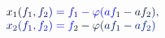 \documentclass[12pt]{article}
\begin{document}
\makeatletter
\renewcommand*{\@textcolor}[3]{%
  \protect\leavevmode
  \begingroup
    \color#1{#2}#3%
  \endgroup
}
\makeatother
\begin{displaymath}
\begin{array} {rl} & { { } \mathcolor[RGB]{0,0,15}{x} _ { \mathcolor[RGB]{0,0,30}{1} } \mathcolor[RGB]{0,0,45}{(} \mathcolor[RGB]{0,0,60}{f} _ { \mathcolor[RGB]{0,0,75}{1} } \mathcolor[RGB]{0,0,90}{,} \mathcolor[RGB]{0,0,105}{f} _ { \mathcolor[RGB]{0,0,120}{2} } \mathcolor[RGB]{0,0,135}{)} \mathcolor[RGB]{0,0,150}{=} \mathcolor[RGB]{0,0,165}{f} _ { \mathcolor[RGB]{0,0,180}{1} } \mathcolor[RGB]{0,0,195}{-} \mathcolor[RGB]{0,0,210}{\varphi} \mathcolor[RGB]{0,0,225}{(} \mathcolor[RGB]{0,0,240}{a} \mathcolor[RGB]{0,0,255}{f} _ { \mathcolor[RGB]{0,15,0}{1} } \mathcolor[RGB]{0,15,15}{-} \mathcolor[RGB]{0,15,30}{a} \mathcolor[RGB]{0,15,45}{f} _ { \mathcolor[RGB]{0,15,60}{2} } \mathcolor[RGB]{0,15,75}{)} \mathcolor[RGB]{0,15,90}{,} } \\ & { { } \mathcolor[RGB]{0,15,105}{x} _ { \mathcolor[RGB]{0,15,120}{2} } \mathcolor[RGB]{0,15,135}{(} \mathcolor[RGB]{0,15,150}{f} _ { \mathcolor[RGB]{0,15,165}{1} } \mathcolor[RGB]{0,15,180}{,} \mathcolor[RGB]{0,15,195}{f} _ { \mathcolor[RGB]{0,15,210}{2} } \mathcolor[RGB]{0,15,225}{)} \mathcolor[RGB]{0,15,240}{=} \mathcolor[RGB]{0,15,255}{f} _ { \mathcolor[RGB]{0,30,0}{2} } \mathcolor[RGB]{0,30,15}{-} \mathcolor[RGB]{0,30,30}{\varphi} \mathcolor[RGB]{0,30,45}{(} \mathcolor[RGB]{0,30,60}{a} \mathcolor[RGB]{0,30,75}{f} _ { \mathcolor[RGB]{0,30,90}{1} } \mathcolor[RGB]{0,30,105}{-} \mathcolor[RGB]{0,30,120}{a} \mathcolor[RGB]{0,30,135}{f} _ { \mathcolor[RGB]{0,30,150}{2} } \mathcolor[RGB]{0,30,165}{)} } \end{array}
\end{displaymath}
\end{document}
